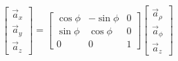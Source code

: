             \begin{equation}
                \begin{bmatrix}
                    \vec{a}_x \\ \vec{a}_y \\ \vec{a}_z
                \end{bmatrix} = 
                \begin{bmatrix}
                    \cos\phi & -\sin\phi & 0 \\
                    \sin\phi & \cos\phi & 0 \\
                    0 & 0 & 1
                \end{bmatrix}
                \begin{bmatrix}
                    \vec{a}_\rho \\
                    \vec{a}_\phi \\
                    \vec{a}_z
                \end{bmatrix}
            \end{equation}

